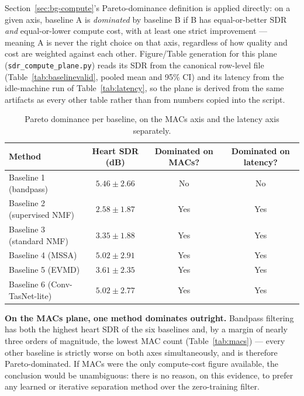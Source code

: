 \documentclass[11pt]{article}
\begin{document}
Section~\ref{sec:bg-compute}'s Pareto-dominance definition is applied
directly: on a given axis, baseline A is \emph{dominated} by baseline B if
B has equal-or-better SDR \emph{and} equal-or-lower compute cost, with at
least one strict improvement --- meaning A is never the right choice on
that axis, regardless of how quality and cost are weighted against each
other. Figure/Table generation for this plane (\texttt{sdr\_compute\_plane.py})
reads its SDR from the canonical row-level file
(Table~\ref{tab:baselinevalid}, pooled mean and 95\% CI) and its latency
from the idle-machine run of Table~\ref{tab:latency}, so the plane is
derived from the same artifacts as every other table rather than from
numbers copied into the script.

\begin{table}[H]
\centering
\caption{Pareto dominance per baseline, on the MACs axis and the latency axis separately.}
\label{tab:pareto}
\begin{tabular}{@{}lccc@{}}
\toprule
Method & Heart SDR (dB) & Dominated on MACs? & Dominated on latency? \\
\midrule
Baseline 1 (bandpass) & $5.46 \pm 2.66$ & No & No \\
Baseline 2 (supervised NMF) & $2.58 \pm 1.87$ & Yes & Yes \\
Baseline 3 (standard NMF) & $3.35 \pm 1.88$ & Yes & Yes \\
Baseline 4 (MSSA) & $5.02 \pm 2.91$ & Yes & Yes \\
Baseline 5 (EVMD) & $3.61 \pm 2.35$ & Yes & Yes \\
Baseline 6 (Conv-TasNet-lite) & $5.02 \pm 2.77$ & Yes & Yes \\
\bottomrule
\end{tabular}
\end{table}

\textbf{On the MACs plane, one method dominates outright.} Bandpass
filtering has both the highest heart SDR of the six baselines and, by a
margin of nearly three orders of magnitude, the lowest MAC count
(Table~\ref{tab:macs}) --- every other baseline is strictly worse on both
axes simultaneously, and is therefore Pareto-dominated. If MACs were the
only compute-cost figure available, the conclusion would be unambiguous:
there is no reason, on this evidence, to prefer any learned or iterative
separation method over the zero-training filter.
\end{document}
